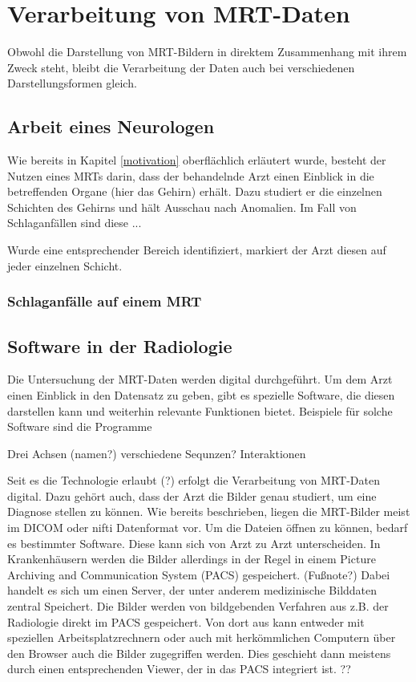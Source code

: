 \section{Verarbeitung von MRT-Daten}						 %
Obwohl die Darstellung von MRT-Bildern in direktem Zusammenhang mit ihrem Zweck steht, bleibt die Verarbeitung der Daten auch bei verschiedenen Darstellungsformen gleich. 

\subsection{Arbeit eines Neurologen}
Wie bereits in Kapitel \ref{motivation} oberflächlich erläutert wurde, besteht der Nutzen eines MRTs darin, dass der behandelnde Arzt einen Einblick in die betreffenden Organe (hier das Gehirn) erhält. Dazu studiert er die einzelnen Schichten des Gehirns und hält Ausschau nach Anomalien.
Im Fall von Schlaganfällen sind diese ...

Wurde eine entsprechender Bereich identifiziert, markiert der Arzt diesen auf jeder einzelnen Schicht. 
\subsubsection{Schlaganfälle auf einem MRT}

\subsection{Software in der Radiologie}
Die Untersuchung der MRT-Daten werden digital durchgeführt. Um dem Arzt einen Einblick in den Datensatz zu geben, gibt es spezielle Software, die diesen darstellen kann und weiterhin relevante Funktionen bietet. Beispiele für solche Software sind die Programme

Drei Achsen (namen?)
verschiedene Sequnzen?
Interaktionen

Seit es die Technologie erlaubt (?) erfolgt die Verarbeitung von MRT-Daten digital. Dazu gehört auch, dass der Arzt die Bilder genau studiert, um eine Diagnose stellen zu können. 
Wie bereits beschrieben, liegen die MRT-Bilder meist im DICOM oder nifti Datenformat vor. Um die Dateien öffnen zu können, bedarf es bestimmter Software. Diese kann sich von Arzt zu Arzt unterscheiden. In Krankenhäusern werden die Bilder allerdings in der Regel in einem Picture Archiving and Communication System (PACS) gespeichert. (Fußnote?) Dabei handelt es sich um einen Server, der unter anderem medizinische Bilddaten zentral Speichert. Die Bilder werden von bildgebenden Verfahren aus z.B. der Radiologie direkt im PACS gespeichert. Von dort aus kann entweder mit speziellen Arbeitsplatzrechnern oder auch mit herkömmlichen Computern über den Browser auch die Bilder zugegriffen werden. Dies geschieht dann meistens durch einen entsprechenden Viewer, der in das PACS integriert ist. ??

